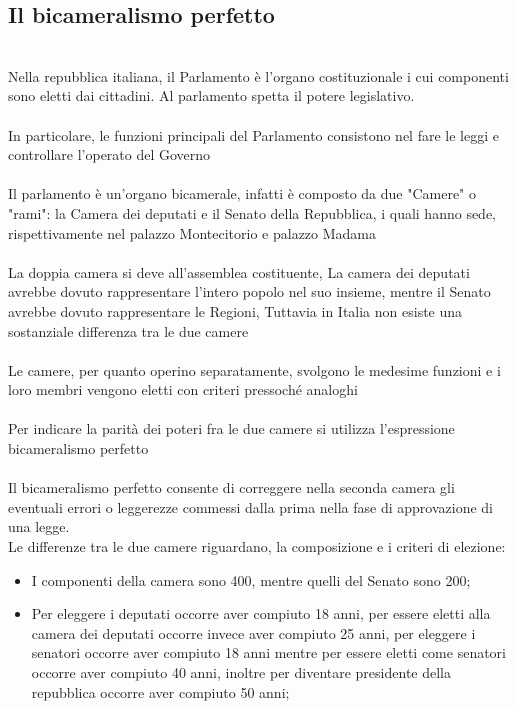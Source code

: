 \documentclass{report}
\begin{document}
\subsection{Il bicameralismo perfetto}
\\
Nella repubblica italiana, il Parlamento è l'organo costituzionale i cui componenti sono eletti dai cittadini. Al parlamento spetta il potere legislativo.
\\
\\
In particolare, le funzioni principali del Parlamento consistono nel fare le leggi e controllare l'operato del Governo
\\
\\
Il parlamento è un'organo bicamerale, infatti è composto da due "Camere" o "rami": la Camera dei deputati e il Senato della Repubblica, i quali hanno sede, rispettivamente nel palazzo Montecitorio e palazzo Madama
\\
\\
La doppia camera si deve all'assemblea costituente, La camera dei deputati avrebbe dovuto rappresentare l'intero popolo nel suo insieme, mentre il Senato avrebbe dovuto rappresentare le Regioni, Tuttavia in Italia non esiste una sostanziale differenza tra le due camere
\\
\\
Le camere, per quanto operino separatamente, svolgono le medesime funzioni e i loro membri vengono eletti con criteri pressoché analoghi
\\
\\
Per indicare la parità dei poteri fra le due camere si utilizza l'espressione bicameralismo perfetto
\\
\\
Il bicameralismo perfetto consente di correggere nella seconda camera gli eventuali errori o leggerezze commessi dalla prima nella fase di approvazione di una legge.
\\
Le differenze tra le due camere riguardano, la composizione e i criteri di elezione:
\begin{itemize}
  \item I componenti della camera sono 400, mentre quelli del Senato sono 200;
  \item Per eleggere i deputati occorre aver compiuto 18 anni, per essere eletti alla camera dei deputati occorre invece aver compiuto 25 anni, per eleggere i senatori occorre aver compiuto 18 anni mentre per essere eletti come senatori occorre aver compiuto 40 anni, inoltre per diventare presidente della repubblica occorre aver compiuto 50 anni;
\end{itemize}
\end{document}
